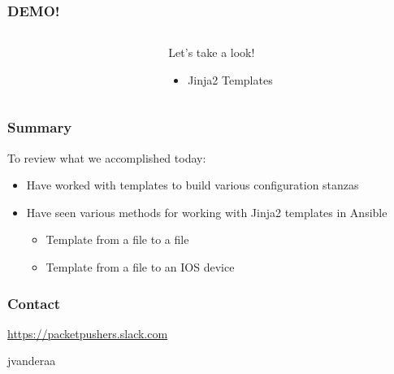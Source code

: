 \documentclass[aspectratio=169]{beamer}
\begin{document}
  \begin{frame}
    \frametitle{DEMO!}
    \begin{columns}
    \begin{column}{0.3\textwidth}
      \Huge
      \begin{center}
        \faDesktop 
        \hspace{.5cm}
        \faRocket     
      \end{center}
    \end{column}
    \begin{column}{0.7\textwidth}
      \huge 
        Let's take a look!
        \begin{itemize}
          \item Jinja2 Templates
        \end{itemize}
    \end{column}
    \end{columns}
  \end{frame}

  \begin{frame}
    \frametitle{Summary}
      To review what we accomplished today:
      \begin{itemize}
        \item <2-> Have worked with templates to build various configuration stanzas
        \item <3-> Have seen various methods for working with Jinja2 templates in Ansible
        \begin{itemize}
            \item <3-> Template from a file to a file
            \item <4-> Template from a file to an IOS device
        \end{itemize}
      \end{itemize}
  \end{frame}

  \begin{frame}
    \frametitle{Contact}
    \huge
    \begin{center}
      \url{https://packetpushers.slack.com}
    \end{center}
    \begin{center}
      \normalsize
      \faSlack \hspace{.1cm}jvanderaa  
    \end{center}
  \end{frame}
\end{document}
